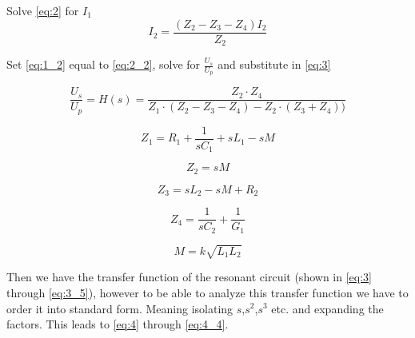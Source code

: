 Solve \cref{eq:2} for $I_1$
\begin{equation} \label{eq:2_2}
    I_2 = \frac{(Z_2 - Z_3 - Z_4) I_2}{Z_2}
\end{equation}

Set \cref{eq:1_2} equal to \cref{eq:2_2}, solve for $\frac{U_s}{U_p}$ and substitute in \cref{eq:3}

\begin{equation} \label{eq:3}
    \frac{U_s}{U_p} = H(s) = \frac{Z_2 \cdot Z_4}{Z_1 \cdot (Z_2 - Z_3 - Z_4) - Z_2 \cdot (Z_3 + Z_4))}
\end{equation}

\begin{equation} \label{eq:3_1}
    Z_1 = R_1 + \frac{1}{s C_1} + s L_1 - s M
\end{equation}

\begin{equation} \label{eq:3_2}
    Z_2 = s M
\end{equation}

\begin{equation} \label{eq:3_3}
    Z_3 = s L_2 - s M + R_2
\end{equation}

\begin{equation} \label{eq:3_4}
    Z_4 = \frac{1}{s C_2} + \frac{1}{G_1}
\end{equation}

\begin{equation} \label{eq:3_5}
    M = k \sqrt{L_1 L_2}
\end{equation}


Then we have the transfer function of the resonant circuit (shown in \cref{eq:3} through \cref{eq:3_5}), however to be able to analyze this transfer function we have to order it into standard form. Meaning isolating $s$,$s^2$,$s^3$ etc. and expanding the factors. This leads to \cref{eq:4} through \cref{eq:4_4}.


